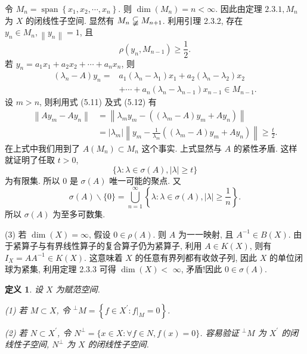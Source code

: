 \documentclass[openany]{ctexbook}
\makeatletter
\theoremstyle{kaiti}
\newtheorem{definition}{定义}[section]
\theoremstyle{normal}
\renewenvironment{proof}[1][\proofname]{\par
    \pushQED{\qed}%
    \normalfont \topsep6\p@\@plus6\p@\relax
    \trivlist
    \item\relax
    {\heiti #1}\hspace{2\labelsep}\ignorespaces
  }{%
    \popQED\endtrivlist\@endpefalse
  }
\makeatother
\begin{document}
\begin{proof}
令 $M_n=\operatorname{span}\left\{x_1, x_2, \cdots, x_n\right\}$. 则 $\operatorname{dim}\left(M_n\right)=n<\infty$. 因此由定理 $2.3.1, M_n$ 为 $X$ 的闭线性子空间. 显然有 $M_n \varsubsetneqq M_{n+1}$. 利用引理 2.3.2, 存在 $y_n \in M_n,\left\|y_n\right\|=1$, 且
\begin{equation}
  \rho\left(y_n, M_{n-1}\right) \geqslant \frac{1}{2}.
\end{equation}
若 $y_n=a_1 x_1+a_2 x_2+\cdots+a_n x_n$, 则
\begin{equation}
  \begin{aligned}
    \left(\lambda_n-A\right) y_n=& a_1\left(\lambda_n-\lambda_1\right) x_1+a_2\left(\lambda_n-\lambda_2\right) x_2 \\
    &+\cdots+a_n\left(\lambda_n-\lambda_{n-1}\right) x_{n-1} \in M_{n-1}.
  \end{aligned}
\end{equation}
设 $m>n$, 则利用式 (5.11) 及式 (5.12) 有
$$
\begin{aligned}
\left\|A y_m-A y_n\right\| &=\left\|\lambda_m y_m-\left(\left(\lambda_m-A\right) y_m+A y_n\right)\right\| \\
&=\left|\lambda_m\right|\left\|y_m-\frac{1}{\lambda_m}\left(\left(\lambda_m-A\right) y_m+A y_n\right)\right\| \geqslant \frac{t}{2}.
\end{aligned}
$$
在上式中我们用到了 $A\left(M_n\right) \subset M_n$ 这个事实. 上式显然与 $A$ 的紧性矛盾. 这样就证明了任取 $t>0$,
$$
\{\lambda: \lambda \in \sigma(A),|\lambda| \geqslant t\}
$$
为有限集. 所以 0 是 $\sigma(A)$ 唯一可能的聚点. 又
$$
\sigma(A) \backslash\{0\}=\bigcup_{n=1}^{\infty}\left\{\lambda: \lambda \in \sigma(A),|\lambda| \geqslant \frac{1}{n}\right\}.
$$
所以 $\sigma(A)$ 为至多可数集.

(3) 若 $\operatorname{dim}(X)=\infty$, 假设 $0 \in \rho(A)$. 则 $A$ 为一一映射, 且 $A^{-1} \in B(X)$. 由于紧算子与有界线性算子的复合算子仍为紧算子, 利用 $A \in K(X)$, 则有 $I_{X}=A A^{-1} \in K(X)$. 这意味着 $X$ 的任意有界列都有收敛子列, 因此 $X$ 的单位闭球为紧集, 利用定理 2.3.3 可得 $\operatorname{dim}(X)<$ $\infty$, 矛盾!因此 $0 \in \sigma(A)$.
\end{proof}

\begin{definition}
设 $X$ 为赋范空间.

(1) 若 $M \subset X$, 令 ${ }^{\perp} M=\left\{f \in X^{\prime}:\left.f\right|_{M}=0\right\}$.

(2) 若 $N \subset X^{\prime}$, 令 $N^{\perp}=\{x \in X: \forall f \in N, f(x)=0\}$.
容易验证 ${ }^{\perp} M$ 为 $X^{\prime}$ 的闭线性子空间, $N^{\perp}$ 为 $X$ 的闭线性子空间.
\end{definition}
\end{document}
